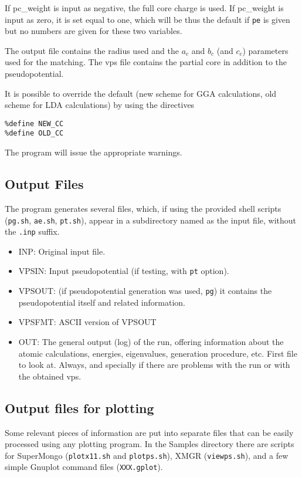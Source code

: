 \documentclass[11pt]{article}
\begin{document}
If pc\_weight is input as negative, the full core charge is used.
If pc\_weight is input as zero, it is set equal to one, which will be
thus the default if {\tt pe} is given but no numbers are given for these
two variables.

The output file contains the radius used and the $a_c$ and $b_c$ (and $c_c$)
parameters used for the matching. The vps file contains the partial core in 
addition to the pseudopotential.

It is possible to override the default (new scheme for GGA
calculations, old scheme for LDA calculations) by using the directives
\begin{verbatim}
%define NEW_CC
%define OLD_CC
\end{verbatim}
The program will issue the appropriate warnings.


\subsection{Output Files}

The program generates several files, which, if using the
provided shell scripts ({\tt pg.sh}, {\tt ae.sh}, {\tt pt.sh}), appear in 
a subdirectory named as the input file, without the {\tt .inp} suffix.
\begin{itemize}
\item
INP: Original input file.

\item
VPSIN: Input pseudopotential (if testing, with {\tt pt} option).

\item
VPSOUT: (if pseudopotential generation was used, {\tt pg}) it contains
the pseudopotential itself and related information.

\item
VPSFMT: ASCII version of VPSOUT

\item
OUT: The general output (log) of the run, offering information about
the atomic calculations, energies, eigenvalues, generation
procedure, etc. First file to look at. Always, and specially
if there are problems with the run or with the obtained vps.
\end{itemize}


\subsection{Output files for plotting}

Some relevant pieces of information are put into separate files that
can be easily processed using any plotting program. In the Samples
directory there are scripts for {\sc SuperMongo} ({\tt plotx11.sh} and 
{\tt plotps.sh}), XMGR ({\tt viewps.sh}), and a few simple {\sc Gnuplot}
command files ({\tt XXX.gplot}).
\end{document}
